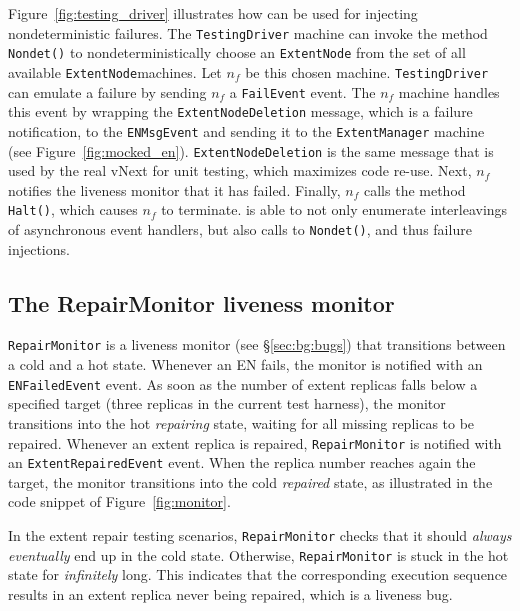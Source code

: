 Figure~\ref{fig:testing_driver} illustrates how \psharp can be used for injecting nondeterministic failures. The \texttt{TestingDriver} machine can invoke the \psharp method \texttt{Nondet()} to nondeterministically choose an \texttt{ExtentNode} from the set of all available \texttt{ExtentNode}machines. Let $n_f$ be this chosen machine. \texttt{TestingDriver} can emulate a failure by sending $n_f$ a \texttt{FailEvent} event. The $n_f$ machine handles this event by wrapping the \texttt{ExtentNodeDeletion} message, which is a failure notification, to the \texttt{ENMsgEvent} and sending it to the \texttt{ExtentManager} machine (see Figure~\ref{fig:mocked_en}). \texttt{ExtentNodeDeletion} is the same message that is used by the real vNext for unit testing, which maximizes code re-use. Next, $n_f$ notifies the liveness monitor that it has failed. Finally, $n_f$ calls the \psharp method \texttt{Halt()}, which causes $n_f$ to terminate. \psharp is able to not only enumerate interleavings of asynchronous event handlers, but also calls to \texttt{Nondet()}, and thus failure injections.

\subsection{The RepairMonitor liveness monitor}
\label{sec:method:monitor}

\texttt{RepairMonitor} is a \psharp liveness monitor (see \S\ref{sec:bg:bugs}) that transitions between a cold and a hot state. Whenever an EN fails, the monitor is notified with an \texttt{ENFailedEvent} event. As soon as the number of extent replicas falls below a specified target (three replicas in the current \psharp test harness), the monitor transitions into the hot \emph{repairing} state, waiting for all missing replicas to be repaired. Whenever an extent replica is repaired, \texttt{RepairMonitor} is notified with an \texttt{ExtentRepairedEvent} event. When the replica number reaches again the target, the monitor transitions into the cold \emph{repaired} state, as illustrated in the code snippet of Figure~\ref{fig:monitor}.

In the extent repair testing scenarios, \texttt{RepairMonitor} checks that it should \emph{always eventually} end up in the cold state. Otherwise, \texttt{RepairMonitor} is stuck in the hot state for \emph{infinitely} long. This indicates that the corresponding execution sequence results in an extent replica never being repaired, which is a liveness bug.

